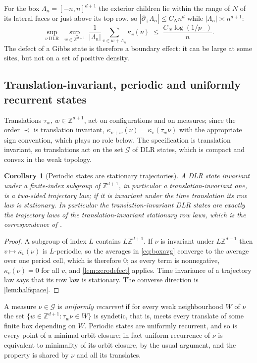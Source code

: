 \documentclass[11pt]{article}
\theoremstyle{plain}
\newtheorem{corollary}[theorem]{Corollary}
\theoremstyle{definition}
\theoremstyle{remark}
\newcommand{\Z}{\mathbb{Z}}
\newcommand{\Lam}{\Lambda}
\begin{document}
For the box $\Lam_n=[-n,n]^{d+1}$ the exterior children lie within the range of $N$ of its lateral faces or just above its top row, so $|\partial_+\Lam_n|\le C_Nn^d$ while $|\Lam_n|\asymp n^{d+1}$:
\begin{equation}
\sup_{\nu\ \mathrm{DLR}}\ \sup_{w\in\Z^{d+1}}\ \frac1{|\Lam_n|}\sum_{v\in w+\Lam_n}\kappa_v(\nu)\;\le\;\frac{C_N\log(1/p_-)}{n}.
\label{eq:boxavg}
\end{equation}
The defect of a Gibbs state is therefore a boundary effect: it can be large at some sites, but not on a set of positive density.

\subsection{Translation-invariant, periodic and uniformly recurrent states}

Translations $\tau_w$, $w\in\Z^{d+1}$, act on configurations and on measures; since the order $\prec$ is translation invariant, $\kappa_{v+w}(\nu)=\kappa_v(\tau_w\nu)$ with the appropriate sign convention, which plays no role below. The specification is translation invariant, so translations act on the set $\mathcal G$ of DLR states, which is compact and convex in the weak topology.

\begin{corollary}[Periodic states are stationary trajectories]
\label{cor:gklm}
A DLR state invariant under a finite-index subgroup of $\Z^{d+1}$, in particular a translation-invariant one, is a two-sided trajectory law; if it is invariant under the time translation its row law is stationary. In particular the translation-invariant DLR states are exactly the trajectory laws of the translation-invariant stationary row laws, which is the correspondence of \cite{GKLM89}.
\end{corollary}

\begin{proof}
A subgroup of index $L$ contains $L\Z^{d+1}$. If $\nu$ is invariant under $L\Z^{d+1}$ then $v\mapsto\kappa_v(\nu)$ is $L$-periodic, so the averages in \eqref{eq:boxavg} converge to the average over one period cell, which is therefore $0$; as every term is nonnegative, $\kappa_v(\nu)=0$ for all $v$, and \cref{lem:zerodefect} applies. Time invariance of a trajectory law says that its row law is stationary. The converse direction is \cref{lem:halfspace}.
\end{proof}

A measure $\nu\in\mathcal G$ is \emph{uniformly recurrent} if for every weak neighbourhood $W$ of $\nu$ the set $\{w\in\Z^{d+1}:\tau_w\nu\in W\}$ is syndetic, that is, meets every translate of some finite box depending on $W$. Periodic states are uniformly recurrent, and so is every point of a minimal orbit closure; in fact uniform recurrence of $\nu$ is equivalent to minimality of its orbit closure, by the usual argument, and the property is shared by $\nu$ and all its translates.
\end{document}
